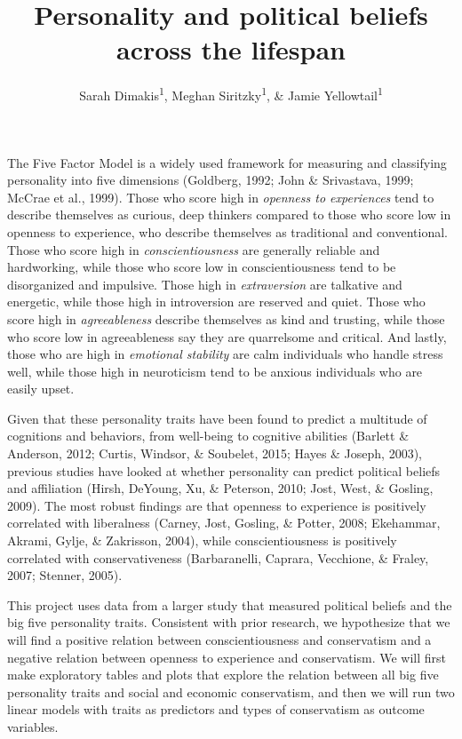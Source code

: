 \documentclass[man]{apa6}
\title{Personality and political beliefs across the lifespan}
\author{Sarah Dimakis\textsuperscript{1}, Meghan Siritzky\textsuperscript{1}, \&
Jamie Yellowtail\textsuperscript{1}}
\date{}
\affiliation{
\vspace{0.5cm}
\textsuperscript{1} University of Oregon}
\begin{document}
\maketitle

The Five Factor Model is a widely used framework for measuring and
classifying personality into five dimensions (Goldberg, 1992; John \&
Srivastava, 1999; McCrae et al., 1999). Those who score high in
\emph{openness to experiences} tend to describe themselves as curious,
deep thinkers compared to those who score low in openness to experience,
who describe themselves as traditional and conventional. Those who score
high in \emph{conscientiousness} are generally reliable and hardworking,
while those who score low in conscientiousness tend to be disorganized
and impulsive. Those high in \emph{extraversion} are talkative and
energetic, while those high in introversion are reserved and quiet.
Those who score high in \emph{agreeableness} describe themselves as kind
and trusting, while those who score low in agreeableness say they are
quarrelsome and critical. And lastly, those who are high in
\emph{emotional stability} are calm individuals who handle stress well,
while those high in neuroticism tend to be anxious individuals who are
easily upset.

Given that these personality traits have been found to predict a
multitude of cognitions and behaviors, from well-being to cognitive
abilities (Barlett \& Anderson, 2012; Curtis, Windsor, \& Soubelet,
2015; Hayes \& Joseph, 2003), previous studies have looked at whether
personality can predict political beliefs and affiliation (Hirsh,
DeYoung, Xu, \& Peterson, 2010; Jost, West, \& Gosling, 2009). The most
robust findings are that openness to experience is positively correlated
with liberalness (Carney, Jost, Gosling, \& Potter, 2008; Ekehammar,
Akrami, Gylje, \& Zakrisson, 2004), while conscientiousness is
positively correlated with conservativeness (Barbaranelli, Caprara,
Vecchione, \& Fraley, 2007; Stenner, 2005).

This project uses data from a larger study that measured political
beliefs and the big five personality traits. Consistent with prior
research, we hypothesize that we will find a positive relation between
conscientiousness and conservatism and a negative relation between
openness to experience and conservatism. We will first make exploratory
tables and plots that explore the relation between all big five
personality traits and social and economic conservatism, and then we
will run two linear models with traits as predictors and types of
conservatism as outcome variables.
\end{document}
